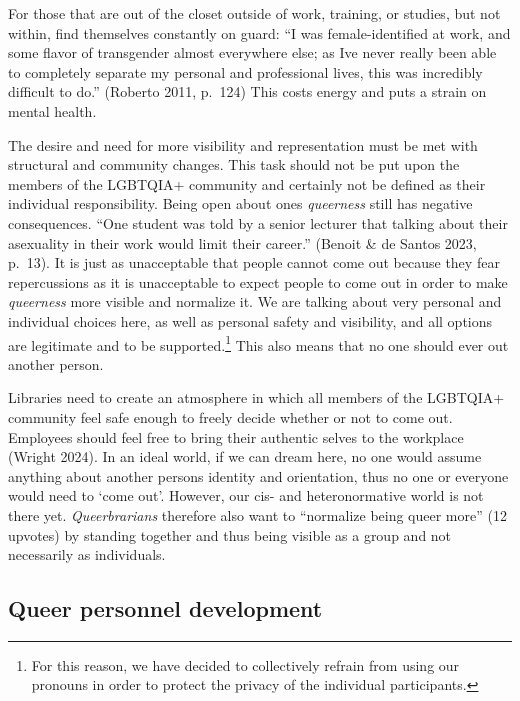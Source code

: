\documentclass[a4paper,
fontsize=11pt,
oneside,
numbers=noperiodatend,
parskip=half-,
bibliography=totoc,
final
]{scrartcl}
\begin{document}
For those that are out of the closet outside of work, training, or
studies, but not within, find themselves constantly on guard: \enquote{I was
female-identified at work, and some flavor of transgender almost
everywhere else; as I\textquotesingle ve never really been able to
completely separate my personal and professional lives, this was
incredibly difficult to do.} (Roberto 2011, p.~124) This costs energy
and puts a strain on mental health.

The desire and need for more visibility and representation must be met
with structural and community changes. This task should not be put upon
the members of the LGBTQIA+ community and certainly not be defined as
their individual responsibility. Being open about one\textquotesingle s
\emph{queerness} still has negative consequences. \enquote{One student was told
by a senior lecturer that talking about their asexuality in their work
would limit their career.} (Benoit \& de Santos 2023, p.~13). It is just
as unacceptable that people cannot come out because they fear
repercussions as it is unacceptable to expect people to come out in
order to make \emph{queerness} more visible and normalize it. We are
talking about very personal and individual choices here, as well as
personal safety and visibility, and all options are legitimate and to be
supported.\footnote{For this reason, we have decided to collectively
  refrain from using our pronouns in order to protect the privacy of the
  individual participants.} This also means that no one should ever out
another person.

Libraries need to create an atmosphere in which all members of the
LGBTQIA+ community feel safe enough to freely decide whether or not to
come out. Employees should feel free to bring their authentic selves to
the workplace (Wright 2024). In an ideal world, if we can dream here, no
one would assume anything about another person\textquotesingle s
identity and orientation, thus no one or everyone would need to
\enquote*{come out}. However, our cis- and heteronormative world is not
there yet. \emph{Queerbrarians} therefore also want to \enquote{normalize being
queer more} (12 upvotes) by standing together and thus being visible as
a group and not necessarily as individuals.

\hypertarget{queer-personnel-development}{%
\subsection{Queer personnel
development}\label{queer-personnel-development}}
\end{document}
